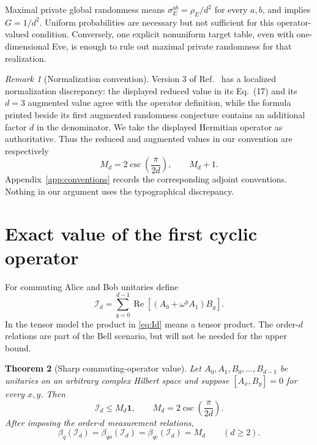 \documentclass[11pt]{article}
\newtheorem{theorem}{Theorem}[section]
\theoremstyle{definition}
\theoremstyle{remark}
\newtheorem{remark}[theorem]{Remark}
\newcommand{\Id}{\mathbf 1}
\newcommand{\cI}{\mathcal I}
\newcommand{\Reop}{\operatorname{Re}}
\begin{document}
Maximal private global randomness means
\(\sigma_E^{ab}=\rho_E/d^2\) for every \(a,b\), and implies
\(G=1/d^2\).  Uniform probabilities are necessary but not sufficient for
this operator-valued condition.  Conversely, one explicit nonuniform target
table, even with one-dimensional Eve, is enough to rule out maximal private
randomness for that realization.

\begin{remark}[Normalization convention]
\label{rem:normalization}
Version 3 of Ref.~\cite{PeritoEtAl2026} has a localized
normalization discrepancy: the displayed reduced value in its Eq.~(17) and
its \(d=3\) augmented value agree with the operator definition, while the
formula printed beside its first augmented randomness conjecture contains an
additional factor \(d\) in the denominator.  We take the displayed Hermitian
operator as authoritative.  Thus the reduced and augmented values in our
convention are respectively
\[
 M_d=2\csc\!\left(\frac{\pi}{2d}\right),
 \qquad M_d+1.
\]
Appendix~\ref{app:conventions} records the corresponding adjoint conventions.
Nothing in our argument uses the typographical discrepancy.
\end{remark}

\section{Exact value of the first cyclic operator}
\label{sec:exact}

For commuting Alice and Bob unitaries define
\begin{equation}
 \cI_d
 =\sum_{y=0}^{d-1}
 \Reop\!\left[(A_0+\omega^yA_1)B_y\right].
 \label{eq:Id}
\end{equation}
In the tensor model the product in \eqref{eq:Id} means a tensor product.  The
order-\(d\) relations are part of the Bell scenario, but will not be needed
for the upper bound.

\begin{theorem}[Sharp commuting-operator value]
\label{thm:exact}
Let \(A_0,A_1,B_0,\ldots,B_{d-1}\) be unitaries on an arbitrary complex
Hilbert space and suppose \([A_x,B_y]=0\) for every \(x,y\).  Then
\begin{equation}
 \cI_d\leq M_d\Id,
 \qquad M_d=2\csc\!\left(\frac{\pi}{2d}\right).
 \label{eq:main-bound}
\end{equation}
After imposing the order-\(d\) measurement relations,
\[
 \boxed{\beta_q(\cI_d)=\beta_{qa}(\cI_d)=\beta_{qc}(\cI_d)=M_d}
 \qquad(d\geq2).
\]
\end{theorem}
\end{document}
